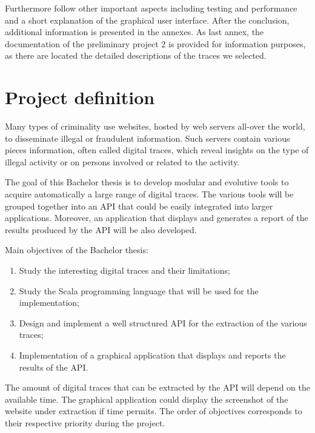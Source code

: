 \documentclass[
	a4paper,					10pt,							twoside,					openright,				notitlepage,			parskip=half,			]{scrreprt}
\begin{document}
Furthermore follow other important aspects including testing and performance and a short
explanation of the graphical user interface. After the conclusion, additional information is
presented in the annexes. As last annex, the documentation of the preliminary project 2 is 
provided for information purposes, as there are located the detailed descriptions of the 
traces we selected.

\section{Project definition}
\label{sec:intro_definition}
Many types of criminality use websites, hosted by web servers all-over the world, 
to disseminate illegal or fraudulent information. 
Such servers contain various pieces information, often called digital traces, 
which reveal insights on the type of illegal activity or on persons involved or related to the activity.

The goal of this Bachelor thesis is to develop modular and evolutive tools to acquire 
automatically a large range of digital traces. The various tools will be grouped together 
into an \gls{API} that could be easily integrated into larger applications. Moreover, an 
application that displays and generates a report of the results produced by the \gls{API} will be also developed.

Main objectives of the Bachelor thesis:
\begin{enumerate}
\item{Study the interesting digital traces and their limitations;}
\item{Study the Scala programming language that will be used for the implementation;}
\item{Design and implement a well structured \gls{API} for the extraction of the various traces;}
\item{Implementation of a graphical application that displays and reports the results of the \gls{API}.}
\end{enumerate}

The amount of digital traces that can be extracted by the \gls{API} will depend on the available time. 
The graphical application could display the screenshot of the website under extraction if time permits. 
The order of objectives corresponds to their respective priority during the project.
\newpage
\end{document}
